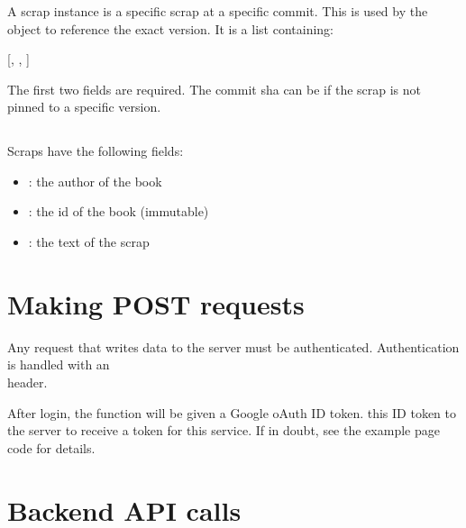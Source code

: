 \documentclass[onecolumn, draftclsnofoot, 10pt, compsoc]{IEEEtran}
\begin{document}
\subsubsection{}\label{sec-scrap_instance}%

\noindent A scrap instance is a specific scrap at a specific commit. This is used
by the  object to reference the exact version. It is a list containing:%

[, , ]%

The first two fields are required. The commit sha can be  if the scrap
is not pinned to a specific version.%

\subsection{}\label{sec-scrap}%

\noindent Scraps have the following fields:%

\begin{itemize}[noitemsep,topsep=\mdcompacttopsep]%

\item{}: the author of the book%

\item{}: the id of the book (immutable)%

\item{}: the text of the scrap%
\end{itemize}%

\section{Making POST requests}\label{sec-making-post-requests}%

\noindent Any request that writes data to the server must be authenticated. Authentication
is handled with an \\  header.%

After login, the  function will be given a Google oAuth ID token. 
this ID token to the server to receive a token for this service. If in doubt,
see the example page code for details.%

\section{Backend API calls}\label{sec-backend-api-calls}%
\end{document}
